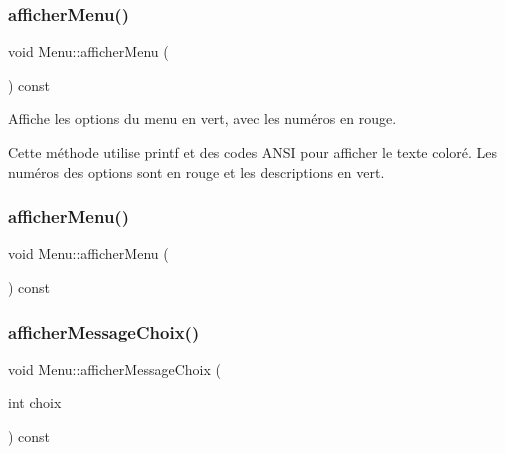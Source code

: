 \subsubsection{\texorpdfstring{afficher\+Menu()}{afficherMenu()}\hspace{0.1cm}{\footnotesize\ttfamily [1/2]}}
{\footnotesize\ttfamily void Menu\+::afficher\+Menu (\begin{DoxyParamCaption}{ }\end{DoxyParamCaption}) const}



Affiche les options du menu en vert, avec les numéros en rouge. 

Cette méthode utilise {\ttfamily printf} et des codes A\+N\+SI pour afficher le texte coloré. Les numéros des options sont en rouge et les descriptions en vert. \mbox{\label{classMenu_a27c166b79b757c245c6183ee8dd5cf2a}} 
\subsubsection{\texorpdfstring{afficher\+Menu()}{afficherMenu()}\hspace{0.1cm}{\footnotesize\ttfamily [2/2]}}
{\footnotesize\ttfamily void Menu\+::afficher\+Menu (\begin{DoxyParamCaption}{ }\end{DoxyParamCaption}) const}

\mbox{\label{classMenu_a16172e4478222f6843e25bb522052c36}} 
\subsubsection{\texorpdfstring{afficher\+Message\+Choix()}{afficherMessageChoix()}\hspace{0.1cm}{\footnotesize\ttfamily [1/2]}}
{\footnotesize\ttfamily void Menu\+::afficher\+Message\+Choix (\begin{DoxyParamCaption}\item[{int}]{choix }\end{DoxyParamCaption}) const}

\mbox{\label{classMenu_a16172e4478222f6843e25bb522052c36}} 
